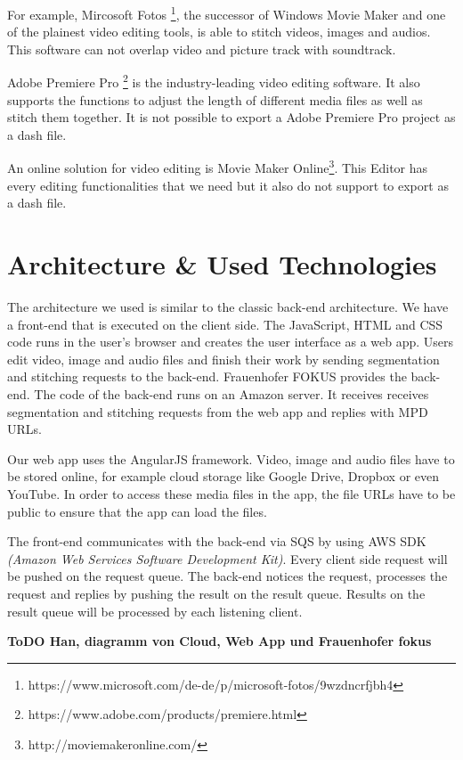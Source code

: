 \documentclass[conference]{IEEEtran}
\begin{document}
For example, Mircosoft Fotos \footnote{https://www.microsoft.com/de-de/p/microsoft-fotos/9wzdncrfjbh4}, the successor of Windows Movie Maker and one of the plainest video editing tools, is able to stitch videos, images and audios.
This software can not overlap video and picture track with soundtrack.

Adobe Premiere Pro \footnote{https://www.adobe.com/products/premiere.html} is the industry-leading video editing software. 
It also supports the functions to adjust the length of different media files as well as stitch them together. 
It is not possible to export a Adobe Premiere Pro project as a dash file.

An online solution for video editing is Movie Maker Online\footnote{http://moviemakeronline.com/}. 
This Editor has every editing functionalities that we need but it also do not support to export as a dash file.

\section{Architecture \& Used Technologies}
The architecture we used is similar to the classic back-end architecture.
We have a front-end that is executed on the client side.
The JavaScript, HTML and CSS code runs in the user's browser and creates the user interface as a web app.
Users edit video, image and audio files and finish their work by sending segmentation and stitching requests to the back-end.
Frauenhofer FOKUS provides the back-end.
The code of the back-end runs on an Amazon server.
It receives receives segmentation and stitching requests from the web app and replies with MPD URLs.

Our web app uses the AngularJS framework.
Video, image and audio files have to be stored online, for example cloud storage like Google Drive, Dropbox or even YouTube.
In order to access these media files in the app, the file URLs have to be public to ensure that the app can load the files.

The front-end communicates with the back-end via SQS by using AWS SDK \textit{(Amazon Web Services Software Development Kit)}.
Every client side request will be pushed on the request queue.
The back-end notices the request, processes the request and replies by pushing the result on the result queue.
Results on the result queue will be processed by each listening client.

\textbf{ToDO Han, diagramm von Cloud, Web App und Frauenhofer fokus}
\end{document}
